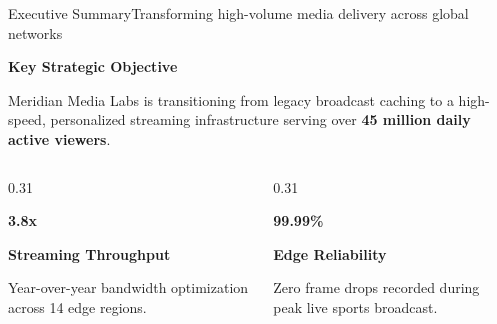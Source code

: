 \documentclass[aspectratio=169,11pt]{beamer}
\begin{document}
\begin{frame}{Executive Summary}{Transforming high-volume media delivery across global networks}
  \begin{center}
  \begin{minipage}{0.96\textwidth}
    \begin{tcolorbox}[keynotecard]
      {\mdseries\bfseries\color{accentblue}\faRocket\quad Key Strategic Objective} \par
      \vspace{2pt}
      \small\color{textdark} Meridian Media Labs is transitioning from legacy broadcast caching to a high-speed, personalized streaming infrastructure serving over \textbf{45 million daily active viewers}.
    \end{tcolorbox}
  \end{minipage}
  \end{center}
  
  \vspace{4pt}
  \begin{columns}[T]
    \begin{column}{0.31\textwidth}
      \begin{tcolorbox}[accentcard]
        \begin{center}
          {\huge\bfseries\color{accentblue} 3.8x} \par
          \vspace{2pt}
          {\small\bfseries Streaming Throughput} \par
          \vspace{2pt}
          {\tiny\color{textmuted} Year-over-year bandwidth optimization across 14 edge regions.}
        \end{center}
      \end{tcolorbox}
    \end{column}
    
    \begin{column}{0.31\textwidth}
      \begin{tcolorbox}[accentcard]
        \begin{center}
          {\huge\bfseries\color{accentpurple} 99.99\%} \par
          \vspace{2pt}
          {\small\bfseries Edge Reliability} \par
          \vspace{2pt}
          {\tiny\color{textmuted} Zero frame drops recorded during peak live sports broadcast.}
        \end{center}
      \end{tcolorbox}
    \end{column}
    

\end{columns}
\end{frame}
\end{document}
